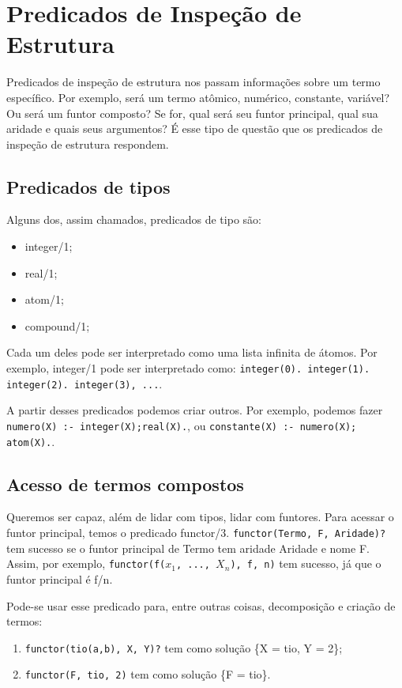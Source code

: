 \documentclass{article}
\theoremstyle{remark}
\theoremstyle{theorem}
\begin{document}
\section{Predicados de Inspeção de Estrutura}

Predicados de inspeção de estrutura nos passam informações sobre um termo específico. Por exemplo, será um termo atômico, numérico, constante, variável? Ou será um funtor composto? Se for, qual será seu funtor principal, qual sua aridade e quais seus argumentos? É esse tipo de questão que os predicados de inspeção de estrutura respondem.

\subsection{Predicados de tipos}

Alguns dos, assim chamados, predicados de tipo são:

\begin{itemize}
  \item integer/1;
  \item real/1;
  \item atom/1;
  \item compound/1;
\end{itemize}

Cada um deles pode ser interpretado como uma lista infinita de átomos. Por exemplo, integer/1 pode ser interpretado como: {\tt integer(0). integer(1). integer(2). integer(3), ...}.

A partir desses predicados podemos criar outros. Por exemplo, podemos fazer {\tt numero(X) :- integer(X);real(X).}, ou {\tt constante(X) :- numero(X); atom(X).}.

\subsection{Acesso de termos compostos}

Queremos ser capaz, além de lidar com tipos, lidar com funtores. Para acessar o funtor principal, temos o predicado functor/3. {\tt functor(Termo, F, Aridade)?} tem sucesso se o funtor principal de Termo tem aridade Aridade e nome F. Assim, por exemplo, {\tt functor(f($x_1$, ..., $X_n$), f, n)} tem sucesso, já que o funtor principal é f/n.

Pode-se usar esse predicado para, entre outras coisas, decomposição e criação de termos:
\begin{enumerate}
  \item{\tt functor(tio(a,b), X, Y)?} tem como solução \{X = tio, Y = 2\};
  \item{\tt functor(F, tio, 2)} tem como solução \{F = tio\}.
\end{enumerate}
\end{document}
